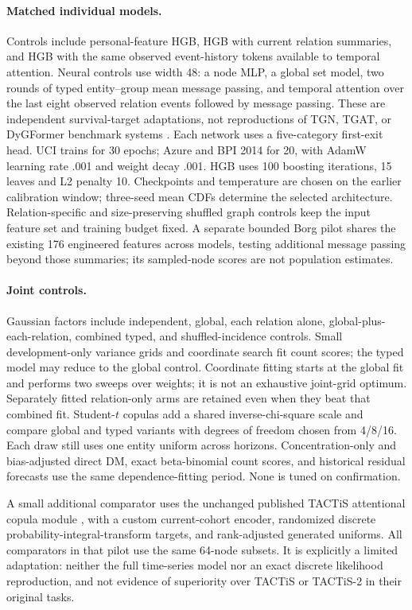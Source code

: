 \paragraph{Matched individual models.}
Controls include personal-feature HGB, HGB with current relation summaries,
and HGB with the same observed event-history tokens available to temporal
attention. Neural controls use width 48: a node MLP, a global set model,
two rounds of typed entity--group mean message passing, and temporal attention
over the last eight observed relation events followed by message passing.
These are independent survival-target adaptations, not reproductions of TGN,
TGAT, or DyGFormer benchmark systems \citep{rossi2020,xu2020,yu2023}.
Each network uses a five-category first-exit head. UCI trains for 30 epochs;
Azure and BPI 2014 for 20, with AdamW learning rate .001 and weight decay .001.
HGB uses 100 boosting iterations, 15 leaves and L2 penalty 10. Checkpoints and temperature
are chosen on the earlier calibration window; three-seed mean CDFs determine
the selected architecture. Relation-specific and size-preserving shuffled
graph controls keep the input feature set and training budget fixed.
A separate bounded Borg pilot shares the existing 176 engineered features
across models, testing additional message passing beyond those summaries;
its sampled-node scores are not population estimates.

\paragraph{Joint controls.}
Gaussian factors include independent, global, each relation alone,
global-plus-each-relation, combined typed, and shuffled-incidence controls.
Small development-only variance grids and coordinate search fit count scores;
the typed model may reduce to the global control. Coordinate fitting starts
at the global fit and performs two sweeps over weights; it is not an exhaustive
joint-grid optimum. Separately fitted relation-only arms are retained even
when they beat that combined fit. Student-$t$ copulas add a
shared inverse-chi-square scale and compare global and typed variants with
degrees of freedom chosen from 4/8/16. Each draw still uses one entity uniform
across horizons. Concentration-only and bias-adjusted direct DM, exact
beta-binomial count scores, and historical residual forecasts use the same
dependence-fitting period. None is tuned on confirmation.

A small additional comparator uses the unchanged published TACTiS attentional
copula module \citep{drouin2022}, with a custom current-cohort encoder,
randomized discrete probability-integral-transform targets, and rank-adjusted
generated uniforms. All comparators in that pilot use the same 64-node subsets.
It is explicitly a limited adaptation: neither the full time-series model nor
an exact discrete likelihood reproduction, and not evidence of superiority
over TACTiS or TACTiS-2 in their original tasks.

